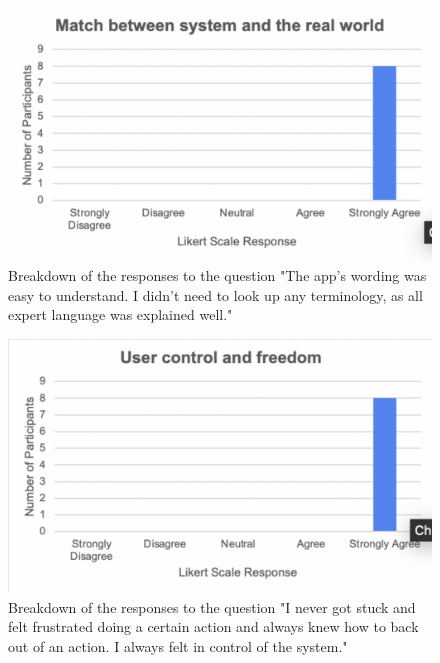 \documentclass{l4proj}
\begin{document}
\begin{appendices}
\begin{figure}[H]
    \begin{centering}
    \includegraphics[scale=0.5]{images/heuristic2.pdf}
    \caption{Breakdown of the responses to the question "The app's wording was easy to understand. I didn't need to look up any terminology, as all expert language was explained well."}
    \label{fig: heuristic2}
    \end{centering}
\end{figure}

\begin{figure}[H]
    \begin{centering}
    \includegraphics[scale=0.5]{images/heuristic3.pdf}
    \caption{Breakdown of the responses to the question "I never got stuck and felt frustrated doing a certain action and always knew how to back out of an action. I always felt in control of the system."}
    \label{fig: heuristic3}
    \end{centering}
\end{figure}


\end{appendices}
\end{document}
